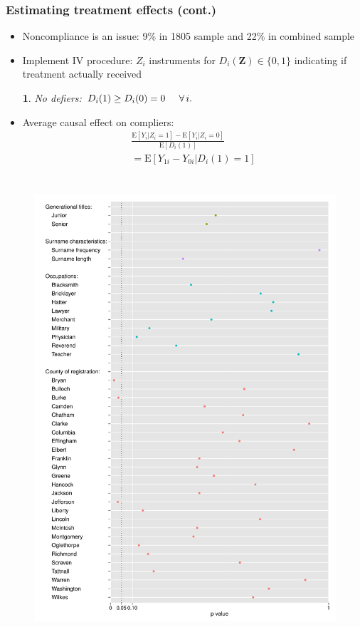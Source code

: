 \documentclass{beamer}
\makeatletter
\newtheorem*{assumption*}{\assumptionnumber}
\providecommand{\assumptionnumber}{}
\newenvironment{assumption}[2]
 {%
  \renewcommand{\assumptionnumber}{Assumption #1}%
  \begin{assumption*}%
  \protected@edef\@currentlabel{#1}%
 }
 {%
  \end{assumption*}
 }
\newcommand{\E}{\mathrm{E}}
\makeatother
\begin{document}
\begin{frame}
\frametitle{Estimating treatment effects (cont.)}
\begin{itemize}
\item Noncompliance is an issue: 9\% in 1805 sample and 22\% in combined sample
\item Implement \citet{angrist1996} IV procedure: $Z_i$ instruments for $D_i (\boldsymbol Z) \in\{0,1\}$ indicating if treatment actually received
\begin{assumption}{3}{}\label{a5}
No defiers: $D_i (1) \geq D_i (0) =0 \hspace{5mm} \forall \,i.$
\end{assumption} 
\item Average causal effect on compliers:
\begin{align}
\frac{\E [Y_i  | Z_i = 1] - \E[Y_i | Z_i = 0]}{\E[D_i (1)]} \\ \nonumber
= \E[Y_{1i} - Y_{0i} | D_i (1)=1] \label{LATE}
\end{align} 
\end{itemize}
\end{frame}

\section[Balance for 1805 sample]{}

\begin{frame}
\begin{figure}[htbp]
\begin{center}
   \includegraphics[width=0.50\linewidth]{balance-plot.pdf} 
  \end{center}
\label{balance-plot}
\end{figure}
\end{frame}
\end{document}
